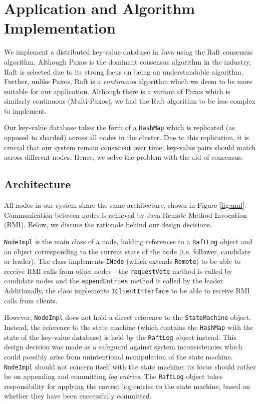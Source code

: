 \documentclass[12pt, a4paper]{article}
\begin{document}
\section{Application and Algorithm Implementation} \label{sec:application}
We implement a distributed key-value database in Java using the Raft consensus algorithm. Although Paxos is the dominant consensus algorithm in the industry, Raft is selected due to its strong focus on being an understandable algorithm. Further, unlike Paxos, Raft is a \textit{continuous} algorithm which we deem to be more suitable for our application. Although there is a variant of Paxos which is similarly continuous (Multi-Paxos), we find the Raft algorithm to be less complex to implement.

Our key-value database takes the form of a \texttt{HashMap} which is replicated (as opposed to sharded) across all nodes in the cluster. Due to this replication, it is crucial that our system remain consistent over time; key-value pairs should match across different nodes. Hence, we solve the problem with the aid of consensus.

\subsection{Architecture}
All nodes in our system share the same architecture, shown in Figure \ref{fig:uml}. Communication between nodes is achieved by Java Remote Method Invocation (RMI). Below, we discuss the rationale behind our design decisions.

\texttt{NodeImpl} is the main class of a node, holding references to a \texttt{RaftLog} object and an object corresponding to the current state of the node (i.e. follower, candidate or leader). The class implements \texttt{INode} (which extends \texttt{Remote}) to be able to receive RMI calls from other nodes---the \texttt{requestVote} method is called by candidate nodes and the \texttt{appendEntries} method is called by the leader. Additionally, the class implements \texttt{IClientInterface} to be able to receive RMI calls from clients.

However, \texttt{NodeImpl} does not hold a direct reference to the \texttt{StateMachine} object. Instead, the reference to the state machine (which contains the \texttt{HashMap} with the state of the key-value database) is held by the \texttt{RaftLog} object instead. This design decision was made as a safeguard against system inconsistencies which could possibly arise from unintentional manipulation of the state machine. \texttt{NodeImpl} should not concern itself with the state machine; its focus should rather be on appending and committing \textit{log entries}. The \texttt{RaftLog} object takes responsibility for applying the correct log entries to the state machine, based on whether they have been successfully committed.
\end{document}

